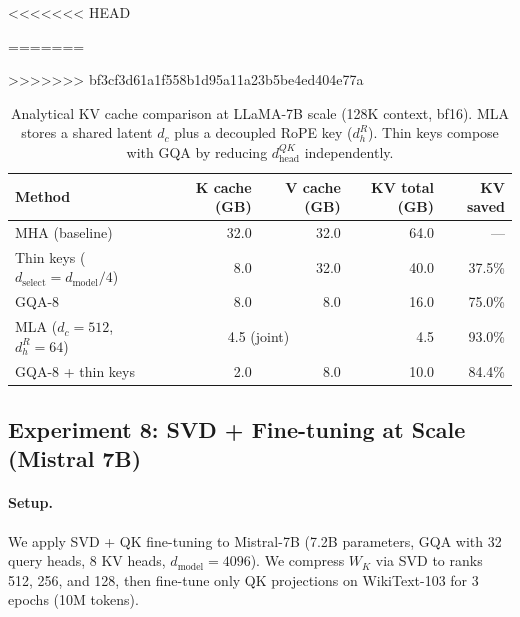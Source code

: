 \documentclass[11pt]{article}
\newcommand{\dmodel}{d_{\text{model}}}
\newcommand{\dselect}{d_{\text{select}}}
\begin{document}
\begin{table}[h]
\centering
<<<<<<< HEAD
\caption{Analytical KV cache comparison at LLaMA-7B scale (128K context, bf16). Thin keys compose with GQA by reducing $d_k$ independently.}
=======
\caption{Analytical KV cache comparison at LLaMA-7B scale (128K context, bf16). MLA stores a shared latent $d_c$ plus a decoupled RoPE key ($d_h^R$). Thin keys compose with GQA by reducing $d_{\text{head}}^{QK}$ independently.}
>>>>>>> bf3cf3d61a1f558b1d95a11a23b5be4ed404e77a
\label{tab:kv_7b_analytical}
\begin{tabular}{lrrrr}
\toprule
Method & K cache (GB) & V cache (GB) & KV total (GB) & KV saved \\
\midrule
MHA (baseline) & 32.0 & 32.0 & 64.0 & --- \\
\midrule
Thin keys ($\dselect = \dmodel/4$) & 8.0 & 32.0 & 40.0 & 37.5\% \\
GQA-8 & 8.0 & 8.0 & 16.0 & 75.0\% \\
MLA ($d_c\!=\!512$, $d_h^R\!=\!64$) & \multicolumn{2}{c}{4.5 (joint)} & 4.5 & 93.0\% \\
\midrule
GQA-8 + thin keys & 2.0 & 8.0 & 10.0 & 84.4\% \\
\bottomrule
\end{tabular}
\end{table}


\subsection{Experiment 8: SVD + Fine-tuning at Scale (Mistral 7B)}

\paragraph{Setup.}
We apply SVD + QK fine-tuning to Mistral-7B (7.2B parameters, GQA with 32 query heads, 8 KV heads, $\dmodel = 4096$). We compress $W_K$ via SVD to ranks 512, 256, and 128, then fine-tune only QK projections on WikiText-103 for 3 epochs (10M tokens).
\end{document}
